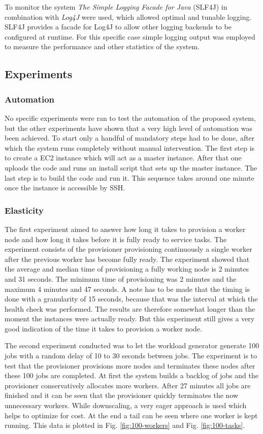 \documentclass[a4paper]{IEEEtran}
\begin{document}
To monitor the system \emph{The Simple Logging Facade for Java} (SLF4J) in combination with \emph{Log4J} were used, which allowed optimal and tunable logging.
SLF4J provides a facade for Log4J to allow other logging backends to be configured at runtime.
For this specific case simple logging output was employed to measure the performance and other statistics of the system.

\subsection{Experiments}

\subsubsection{Automation}
No specific experiments were ran to test the automation of the proposed system, but the other experiments have shown that a very high level of automation was been achieved.
To start only a handful of mandatory steps had to be done, after which the system runs completely without manual intervention.
The first step is to create a EC2 instance which will act as a master instance.
After that one uploads the code and runs an install script that sets up the master instance.
The last step is to build the code and run it.
This sequence takes around one minute once the instance is accessible by SSH.

\subsubsection{Elasticity}

The first experiment aimed to answer how long it takes to provision a worker node and how long it takes before it is fully ready to service tasks.
The experiment consists of the provisioner provisioning continuously a single worker after the previous worker has become fully ready.
The experiment showed that the average and median time of provisioning a fully working node is 2 minutes and 31 seconds.
The minimum time of provisioning was 2 minutes and the maximum 4 minutes and 47 seconds.
A note has to be made that the timing is done with a granularity of 15 seconds, because that was the interval at which the health check was performed.
The results are therefore somewhat longer than the moment the instances were actually ready.
But this experiment still gives a very good indication of the time it takes to provision a worker node.

The second experiment conducted was to let the workload generator generate 100 jobs with a random delay of 10 to 30 seconds between jobs.
The experiment is to test that the provisioner provisions more nodes and terminates these nodes after these 100 jobs are completed.
At first the system builds a backlog of jobs and the provisioner conservatively allocates more workers.
After 27 minutes all jobs are finished and it can be seen that the provisioner quickly terminates the now unnecessary workers.
While downscaling, a very eager approach is used which helps to optimize for cost.
At the end a tail can be seen where one worker is kept running.
This data is plotted in Fig. \ref{fig:100-workers} and Fig. \ref{fig:100-tasks}.
\end{document}
